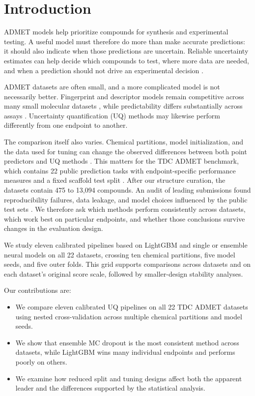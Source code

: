 \section{Introduction}
\label{sec:introduction}

ADMET models help prioritize compounds for synthesis and experimental testing. A useful model must
therefore do more than make accurate predictions: it should also indicate when those predictions
are uncertain. Reliable uncertainty estimates can help decide which compounds to test, where more
data are needed, and when a prediction should not drive an experimental decision
\citep{hirschfeld2020uncertainty}.

ADMET datasets are often small, and a more complicated model is not necessarily better. Fingerprint
and descriptor models remain competitive across many small molecular datasets
\citep{notwell2023maplight,praski2025benchmarking}, while predictability differs substantially
across assays \citep{aleksic2022predictability}. Uncertainty quantification
(UQ) methods may likewise perform differently from one endpoint to another.

The comparison itself also varies. Chemical partitions, model initialization, and the data used for
tuning can change the observed differences between both point predictors and UQ methods
\citep{bouthillier2021accounting,ash2025practically}. This matters for the TDC ADMET benchmark, which
contains 22 public prediction tasks with endpoint-specific performance measures and a fixed scaffold
test split \citep{huang2021tdc}. After our structure curation, the datasets contain 475 to 13,094
compounds. An audit of leading
submissions found reproducibility failures, data leakage, and model choices influenced by the public
test sets \citep{koleiev2026enduser}. We therefore ask which methods perform consistently across
datasets, which work best on particular endpoints, and whether those conclusions survive changes in
the evaluation design.

We study eleven calibrated pipelines based on LightGBM and single or ensemble neural models on all
22 datasets, crossing ten chemical partitions, five model seeds, and five outer folds. This grid
supports comparisons across datasets and on each dataset's original score scale, followed by
smaller-design stability analyses.

Our contributions are:
\begin{itemize}
  \item We compare eleven calibrated UQ pipelines on all 22 TDC ADMET datasets using nested
  cross-validation across multiple chemical partitions and model seeds.
  \item We show that ensemble MC dropout is the most consistent method across datasets, while
  LightGBM wins many individual endpoints and performs poorly on others.
  \item We examine how reduced split and tuning designs affect both the apparent leader and the
  differences supported by the statistical analysis.
\end{itemize}
